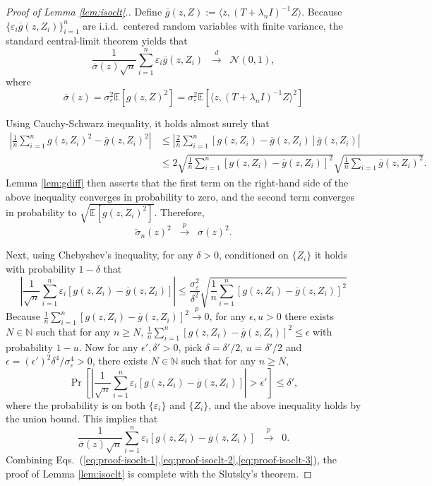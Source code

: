 \documentclass[11pt,a4paper]{article}
\renewcommand{\tilde}{\widetilde}
\renewcommand{\bar}{\overline}
\theoremstyle{definition}
\theoremstyle{plain}
\theoremstyle{remark}
\begin{document}
\begin{proof}[Proof of Lemma \ref{lem:isoclt}.]
Define $\bar g(z,Z) := \langle z,(T+\lambda_n I)^{-1}Z\rangle$.
Because $\{\varepsilon_i\bar g(z,Z_i)\}_{i=1}^n$ are i.i.d.~centered random variables with finite variance, the standard central-limit theorem yields that
\begin{equation}
\frac{1}{\bar\sigma(z)\sqrt{n}}\sum_{i=1}^n \varepsilon_i\bar g(z,Z_i) \;\;\overset{d}{\to}\;\;\mathcal N(0,1),
\label{eq:proof-isoclt-1}
\end{equation}
where
$$
\bar\sigma(z) =\sigma_\varepsilon^2\mathbb E[g(z,Z)^2]= \sigma_\varepsilon^2\mathbb E[\langle z, (T+\lambda_n I)^{-1}Z\rangle^2]
$$

Using Cauchy-Schwarz inequality, it holds almost surely that
\begin{align*}
\left|\frac{1}{n}\sum_{i=1}^n g(z,Z_i)^2-\bar g(z,Z_i)^2\right| &\leq \left|\frac{2}{n}\sum_{i=1}^n [g(z,Z_i)-\bar g(z,Z_i)]\bar g(z,Z_i)\right|\\
&\leq 2\sqrt{\frac{1}{n}\sum_{i=1}^n[g(z,Z_i)-\bar g(z,Z_i)]^2}\sqrt{\frac{1}{n}\sum_{i=1}\bar g(z,Z_i)^2}.
\end{align*}
Lemma \ref{lem:gdiff} then asserts that the first term on the right-hand side of the above inequality converges in probability to zero, and the second term converges in probability to $\sqrt{\mathbb E[g(z,Z_i)^2]}$.
Therefore,
\begin{equation}
\tilde\sigma_n(z)^2 \;\;\overset{p}{\to}\;\; \bar\sigma(z)^2.
\label{eq:proof-isoclt-2}
\end{equation}

Next, using Chebyshev's inequality, for any $\delta>0$, conditioned on $\{Z_i\}$ it holds with probability $1-\delta$ that
$$
\left|\frac{1}{\sqrt{n}}\sum_{i=1}^n\varepsilon_i[g(z,Z_i)-\bar g(z,Z_i)]\right| \leq \frac{\sigma_\varepsilon^2}{\delta^2}\sqrt{\frac{1}{n}\sum_{i=1}^n[g(z,Z_i)-\bar g(z,Z_i)]^2} 
$$
Because $\frac{1}{n}\sum_{i=1}^n[g(z,Z_i)-\bar g(z,Z_i)]^2\overset{p}{\to}0$, for any $\epsilon,u>0$ there exists $N\in\mathbb N$ such that for any $n\geq N$, $\frac{1}{n}\sum_{i=1}^n[g(z,Z_i)-\bar g(z,Z_i)]^2\leq\epsilon$
with probability $1-u$.
Now for any $\epsilon',\delta'>0$, pick $\delta=\delta'/2$, $u=\delta'/2$ and $\epsilon=(\epsilon')^2\delta^4/\sigma_\varepsilon^4>0$, there exists $N\in\mathbb N$ such that for any $n\geq N$, 
$$
\Pr\left[\left|\frac{1}{\sqrt{n}}\sum_{i=1}^n\varepsilon_i[g(z,Z_i)-\bar g(z,Z_i)]\right|>\epsilon'\right]\leq\delta',
$$
where the probability is on both $\{\varepsilon_i\}$ and $\{Z_i\}$, and the above inequality holds by the union bound.
This implies that
\begin{equation}
\frac{1}{\bar\sigma(z)\sqrt{n}}\sum_{i=1}^n\varepsilon_i[g(z,Z_i)-\bar g(z,Z_i)] \;\;\overset{p}{\to}\;\; 0.
\label{eq:proof-isoclt-3}
\end{equation}
Combining Eqs.~(\ref{eq:proof-isoclt-1},\ref{eq:proof-isoclt-2},\ref{eq:proof-isoclt-3}), the proof of Lemma \ref{lem:isoclt} is complete with the Slutsky's theorem.
\end{proof}
\end{document}
